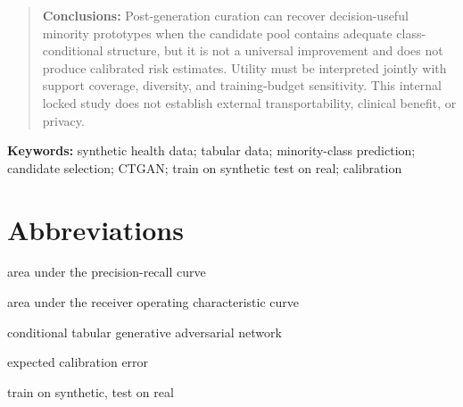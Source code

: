 \documentclass[11pt]{article}
\begin{document}
\begin{abstract}
\textbf{Conclusions:} Post-generation curation can recover decision-useful minority prototypes when the candidate pool contains adequate class-conditional structure, but it is not a universal improvement and does not produce calibrated risk estimates. Utility must be interpreted jointly with support coverage, diversity, and training-budget sensitivity. This internal locked study does not establish external transportability, clinical benefit, or privacy.
\end{abstract}

\noindent\textbf{Keywords:} synthetic health data; tabular data; minority-class prediction; candidate selection; CTGAN; train on synthetic test on real; calibration










\section*{Abbreviations}
\begin{description}[leftmargin=3cm]
\item[AUPRC] area under the precision-recall curve
\item[AUROC] area under the receiver operating characteristic curve
\item[CTGAN] conditional tabular generative adversarial network
\item[ECE] expected calibration error
\item[TSTR] train on synthetic, test on real
\end{description}



\end{document}
